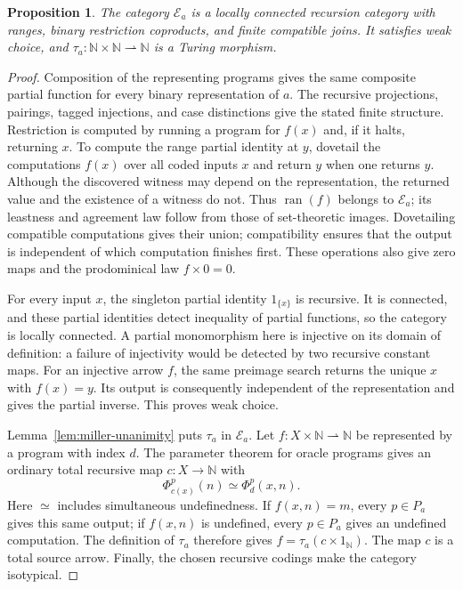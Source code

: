 \documentclass[11pt]{article}
\newtheorem{proposition}[theorem]{Proposition}
\newcommand{\N}{\mathbb N}
\newcommand{\ran}{\operatorname{ran}}
\begin{document}
\begin{proposition}\label{prop:miller-category}
The category $\mathcal E_a$ is a locally connected recursion category
with ranges, binary restriction coproducts, and finite compatible joins.
It satisfies weak choice, and $\tau_a:\N\times\N\rightharpoonup\N$
is a Turing morphism.
\end{proposition}
\begin{proof}
Composition of the representing programs gives the same composite
partial function for every binary representation of $a$.
The recursive projections, pairings,
tagged injections, and case distinctions give the stated finite
structure. Restriction is computed by running a program for $f(x)$ and,
if it halts, returning $x$. To compute the range partial identity at
$y$, dovetail the computations $f(x)$ over all coded inputs $x$ and
return $y$ when one returns $y$. Although the discovered witness may
depend on the representation, the returned value and the existence of a witness
do not. Thus $\ran(f)$ belongs to $\mathcal E_a$; its leastness and
agreement law follow from those of set-theoretic images.
Dovetailing compatible computations gives their union;
compatibility ensures that the output is independent of which
computation finishes first. These operations also give zero maps and
the prodominical law $f\times0=0$.

For every input $x$, the singleton partial identity $1_{\{x\}}$ is
recursive. It is connected, and these partial identities detect
inequality of partial functions, so the category is locally connected.
A partial monomorphism here is injective on its domain of definition: a failure of
injectivity would be detected by two recursive constant maps. For an
injective arrow $f$, the same preimage search returns the unique $x$
with $f(x)=y$. Its output is consequently independent of the representation and
gives the partial inverse. This proves weak choice.

Lemma~\ref{lem:miller-unanimity} puts $\tau_a$ in $\mathcal E_a$.
Let $f:X\times\N\rightharpoonup\N$ be represented by a program with
index $d$. The parameter theorem for oracle programs gives an ordinary
total recursive map $c:X\to\N$ with
\[
 \Phi_{c(x)}^p(n)\simeq\Phi_d^p(x,n).
\]
Here $\simeq$ includes simultaneous undefinedness.
If $f(x,n)=m$, every $p\in P_a$ gives this same output; if $f(x,n)$ is
undefined, every $p\in P_a$ gives an undefined computation. The definition
of $\tau_a$ therefore gives
$f=\tau_a(c\times1_{\N})$. The map $c$ is a total source arrow.
Finally, the chosen recursive codings make the category isotypical.
\end{proof}
\end{document}
